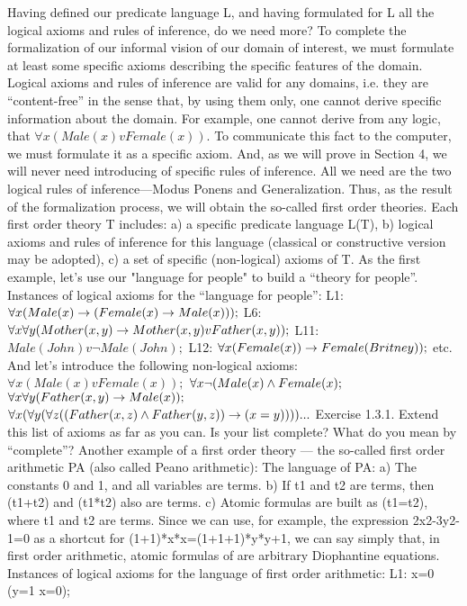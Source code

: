Having defined our predicate language L, and having formulated for L all the logical axioms and rules of
inference, do we need more?
To complete the formalization of our informal vision of our domain of interest, we must formulate at least
some specific axioms describing the specific features of the domain. Logical axioms and rules of
inference are valid for any domains, i.e. they are ``content-free'' in the sense that, by using them only, one
cannot derive specific information about the domain.
For example, one cannot derive from any logic, that \(\forall x (Male(x) v Female(x))\). To communicate this fact
to the computer, we must formulate it as a specific axiom.
And, as we will prove in Section 4, we will never need introducing of specific rules of inference. All we
need are the two logical rules of inference---Modus Ponens and Generalization.
Thus, as the result of the formalization process, we will obtain the so-called first order theories.
Each first order theory T includes:
a) a specific predicate language L(T),
b) logical axioms and rules of inference for this language (classical or constructive version may be
adopted),
c) a set of specific (non-logical) axioms of T.
As the first example, let's use our "language for people" to build a ``theory for people''.
Instances of logical axioms for the ``language for people'':
L1: \(\forall x(Male(x)\rightarrow (Female(x)\rightarrow Male(x)));\)
L6: \(\forall x\forall y(Mother(x, y)\rightarrow Mother(x, y) v Father(x, y));\)
L11: \(Male(John) v \neg Male(John);\)
L12: \(\forall x(Female(x))\rightarrow Female(Britney));\)
etc.
And let's introduce the following non-logical axioms:
\(\forall x (Male(x) v Female(x));\)
\(\forall x \neg (Male(x) \wedge  Female(x);\)
\(\forall x\forall y (Father (x, y)\rightarrow Male(x));\)
\(\forall x(\forall y(\forall z((Father(x, z)\wedge Father(y,z))\rightarrow (x=y)))) ...\)
Exercise 1.3.1. Extend this list of axioms as far as you can. Is your list complete? What do you mean by ``complete''?
Another example of a first order theory --- the so-called first order arithmetic PA (also called Peano arithmetic):
The language of PA:
a) The constants 0 and 1, and all variables are terms.
b) If t1 and t2 are terms, then (t1+t2) and (t1*t2) also are terms.
c) Atomic formulas are built as (t1=t2), where t1 and t2 are terms.
Since we can use, for example, the expression 2x2-3y2-1=0 as a shortcut for (1+1)*x*x=(1+1+1)*y*y+1, we can say simply
that, in first order arithmetic, atomic formulas of are arbitrary Diophantine equations.
Instances of logical axioms for the language of first order arithmetic:
L1: x=0 \IMPLIES  (y=1 \IMPLIES  x=0);
